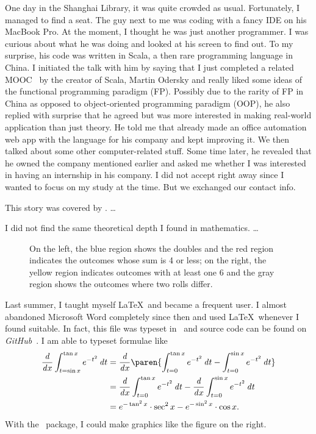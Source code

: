 	One day in the Shanghai Library, it was quite crowded as usual. Fortunately, I
	managed to find a seat. The guy next to me was coding with a fancy IDE on his
	MacBook Pro. At the moment, I thought he was just another programmer. I was
	curious about what he was doing and looked at his screen to find out. To my
	surprise, his code was written in Scala, a then rare programming language in
	China. I initiated the talk with him by saying that I just completed a related
	MOOC~\cite{FPPS} by the creator of Scala, Martin Odersky and really liked some
	ideas of the functional programming paradigm (FP). Possibly due to the rarity
	of FP in China as opposed to object-oriented programming paradigm (OOP), he
	also replied with surprise that he agreed but was more interested in making
	real-world application than just theory. He told me that already made an office
	automation web app with the language for his company and kept improving it. We
	then talked about some other computer-related stuff. Some time later, he
	revealed that he owned the company mentioned earlier and asked me whether I was
	interested in having an internship in his company. I did not accept right away
	since I wanted to focus on my study at the time. But we exchanged our contact
	info.
	
	This story was covered by . \dots %
	
	I did not find the same theoretical depth I found in mathematics.
	\dots
	
	\begin{wrapfigure}[8]{r}[.6in]{.4\textwidth}
		\scalebox{.4}{  }
		\caption{On the left, the blue region shows the doubles and the red region
			indicates the outcomes whose sum is 4 or less; on the right, the yellow region
			indicates outcomes with at least one 6 and the gray region shows the outcomes
			where two rolls differ.}
		\label{fig:CondProbEx}
	\end{wrapfigure}
	
	Last summer, I taught myself \LaTeX\ and became a frequent user. I almost
	abandoned Microsoft Word completely since then and used \LaTeX\ whenever I found
	suitable. In fact, this file was typeset in \LuaLaTeX\ and source code can be
	found on \textit{GitHub}~\cite{Readmission}. I am able to typeset formulae like
	\begin{align*}
	\dd x \int_{t=\sin x}^{\tan x} e^{-t^2} \dt
		&= \dd x \paren{\int_{t=0}^{\tan x} e^{-t^2} \dt -
			\int_{t=0}^{\sin x} e^{-t^2} \dt} \\
		&= \dd x \int_{t=0}^{\tan x} e^{-t^2} \dt
			- \dd x \int_{t=0}^{\sin x} e^{-t^2} \dt \\
		&= e^{-\tan^2 x} \cdot \sec^2 x - e^{-\sin^2 x} \cdot \cos x.
	\end{align*}
	With the \TikZ\ package, I could make graphics like the figure on the right.
	
